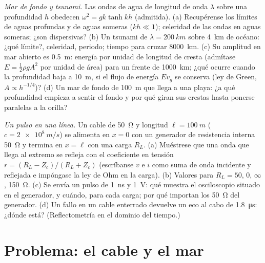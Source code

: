 \begin{exercise}[$\star\star\star$]\label{exo:b2:dispersion-wave-packets:11}
\emph{Mar de fondo y tsunami.} Las ondas de agua de longitud de onda $\lambda$
sobre una profundidad $h$ obedecen $\omega^2 = gk\tanh kh$ (admitida). (a)
Recupérense los límites de aguas profundas y de aguas someras
($kh \ll 1$); celeridad de las ondas en aguas someras; ¿son dispersivas?
(b) Un tsunami de $\lambda = \qty{200}{km}$ sobre \qty{4}{km} de océano:
¿qué límite?, celeridad, periodo; tiempo para cruzar \qty{8000}{km}. (c) Su
amplitud en mar abierto es \qty{0.5}{m}: energía por unidad de longitud de cresta
(admítase $E = \tfrac12\rho gA^2$ por unidad de área) para un frente de \qty{1000}{km}; ¿qué
ocurre cuando la profundidad baja a \qty{10}{m}, si el flujo de energía $Ev_g$ se
conserva (ley de Green, $A \propto h^{-1/4}$)? (d) Un mar de fondo de \qty{100}{m}
que llega a una playa: ¿a qué profundidad empieza a sentir el fondo y por
qué giran sus crestas hasta ponerse paralelas a la orilla?
\end{exercise}

\begin{exercise}[$\star\star\star$]\label{exo:b2:dispersion-wave-packets:12}
\emph{Un pulso en una línea.} Un cable de \qty{50}{\ohm} y longitud $\ell = \qty{100}{m}$
($c = \qty{2e8}{m/s}$) se alimenta en $x = 0$ con un generador de
resistencia interna \qty{50}{\ohm} y termina en $x = \ell$ con una carga $R_L$. (a) Muéstrese
que una onda que llega al extremo se refleja con el coeficiente en
tensión $r = (R_L - Z_c)/(R_L + Z_c)$ (escríbanse $v$ e $i$ como suma de
onda incidente y reflejada e impóngase la ley de Ohm en la carga). (b) Valores para
$R_L = 50$, $0$, $\infty$, \qty{150}{\ohm}. (c) Se envía un pulso de \qty{1}{ns} y \qty{1}{V}:
qué muestra el osciloscopio situado en el generador, y cuándo, para cada
carga; por qué importan los \qty{50}{\ohm} del generador. (d) Un fallo en un cable
enterrado devuelve un eco al cabo de \qty{1.8}{\micro s}: ¿dónde está? (Reflectometría
en el dominio del tiempo.)
\end{exercise}

\section{Problema: el cable y el mar}

